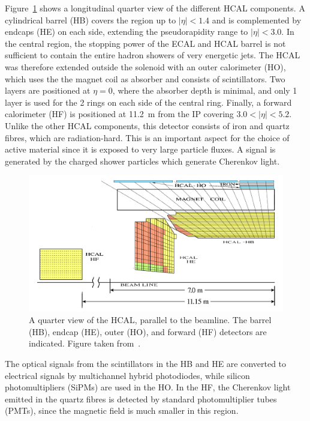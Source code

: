 Figure~\ref{fig:hcal} shows a longitudinal quarter view of the different \ac{HCAL} components. A cylindrical barrel (HB) covers the region up to $|\eta| < 1.4$ and is complemented by endcaps (HE) on each side, extending the pseudorapidity range to $|\eta| < 3.0$. In the central region, the stopping power of the \ac{ECAL} and \ac{HCAL} barrel is not sufficient to contain the entire hadron showers of very energetic jets. The \ac{HCAL} was therefore extended outside the solenoid with an outer calorimeter (HO), which uses the the magnet coil as absorber and consists of scintillators. Two layers are positioned at $\eta = 0$, where the absorber depth is minimal, and only 1 layer is used for the 2 rings on each side of the central ring. Finally, a forward calorimeter (HF) is positioned at 11.2~m from the \ac{IP} covering $3.0 < |\eta| < 5.2$. Unlike the other \ac{HCAL} components, this detector consists of iron and quartz fibres, which are radiation-hard. This is an important aspect for the choice of active material since it is exposed to very large particle fluxes. A signal is generated by the charged shower particles which generate Cherenkov light.

\begin{figure}[ht]
  \centering
 \includegraphics[width=.9\textwidth]{hcal}
 \caption{A quarter view of the \protect\acf{HCAL}, parallel to the beamline. The barrel (HB), endcap (HE), outer (HO), and forward (HF) detectors are indicated. Figure taken from~\cite{Chatrchyan:2008aa}.}
 \label{fig:hcal}
\end{figure}

The optical signals from the scintillators in the HB and HE are converted to electrical signals by multichannel hybrid photodiodes, while silicon photomultipliers (SiPMs) are used in the HO. In the HF, the Cherenkov light emitted in the quartz fibres is detected by standard photomultiplier tubes (PMTs), since the magnetic field is much smaller in this region.


